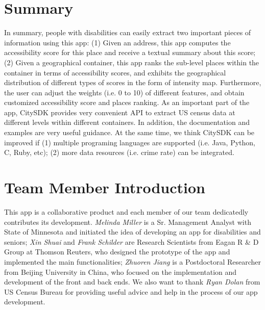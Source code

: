 \documentclass[10pt]{article}
\begin{document}
 \section{Summary}
 In summary, people with disabilities can easily extract two important pieces of information using this app: (1) Given an address, this app computes the accessibility score for this place and receive a textual summary about this score; (2) Given a geographical container, this app ranks the sub-level places within the container in terms of accessibility scores, and exhibits the geographical distribution of different types of scores in the form of intensity map. Furthermore, the user can adjust the weights (i.e. 0 to 10) of different features, and obtain customized accessibility score and places ranking.
As an important part of the app, CitySDK provides very convenient API to extract US census data at different levels within different containers. In addition, the documentation and examples are very useful guidance. At the same time, we think CitySDK can be improved if (1) multiple programing languages are supported (i.e. Java, Python, C, Ruby, etc); (2) more data resources (i.e. crime rate) can be integrated. 

\section*{Team Member Introduction}
This app is a collaborative product and each member of our team dedicatedly contributes its development. \emph{Melinda Miller} is a Sr. Management Analyst with State of Minnesota and initiated the idea of developing an app for disabilities and seniors; \emph{Xin Shuai} and \emph{Frank Schilder} are Research Scientists from Eagan R \& D Group at Thomson Reuters, who designed the prototype of the app and implemented the main functionalities; \emph{Zhuoren Jiang} is a Postdoctoral Researcher from Beijing University in China, who focused on the implementation and development of the front and back ends. We also want to thank \emph{Ryan Dolan} from US Census Bureau for providing useful advice and help in the process of our app development.
%
%
%




%
%
\end{document}
